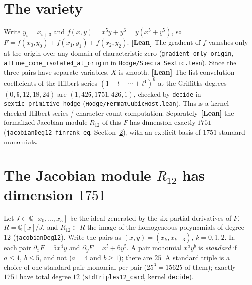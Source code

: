 \documentclass[11pt]{amsart}
\theoremstyle{remark}\newtheorem{remark}[theorem]{Remark}
\newcommand{\Q}{\mathbb{Q}}\newcommand{\PP}{\mathbb{P}}
\begin{document}
\section{The variety}
Write $y_i=x_{i+3}$ and $f(x,y)=x^5y+y^6=y(x^5+y^5)$, so $F=f(x_0,y_0)+f(x_1,y_1)+f(x_2,y_2)$.
\textbf{[Lean]} The gradient of $f$ vanishes only at the origin over any domain of characteristic
zero (\texttt{gradient\_only\_origin}, \texttt{affine\_cone\_isolated\_at\_origin} in
\texttt{Hodge/SpecialSextic.lean}). Since the three pairs have separate variables, $X$ is smooth.
\textbf{[Lean]} The list-convolution coefficients of the Hilbert series
$(1+t+\cdots+t^4)^6$ at the Griffiths degrees $(0,6,12,18,24)$ are
$(1,426,1751,426,1)$, checked by \texttt{decide} in
\texttt{sextic\_primitive\_hodge} (\texttt{Hodge/FermatCubicHost.lean}).
This is a kernel-checked Hilbert-series / character-count computation. Separately,
\textbf{[Lean]} the formalized Jacobian module $R_{12}$ of this $F$ has dimension
exactly $1751$ (\texttt{jacobianDeg12\_finrank\_eq}, Section~\ref{sec:r12}), with an
explicit basis of $1751$ standard monomials.

\section{The Jacobian module $R_{12}$ has dimension $1751$}\label{sec:r12}
Let $J\subset\Q[x_0,\dots,x_5]$ be the ideal generated by the six partial derivatives
of $F$, $R=\Q[x]/J$, and $R_{12}\subset R$ the image of the homogeneous polynomials of
degree $12$ (\texttt{jacobianDeg12}). Write the pairs as $(x,y)=(x_k,x_{k+3})$, $k=0,1,2$.
In each pair $\partial_xF=5x^4y$ and $\partial_yF=x^5+6y^5$.
A pair monomial $x^ay^b$ is \emph{standard} if $a\le4$, $b\le5$, and not ($a=4$ and
$b\ge1$); there are $25$. A standard triple is a choice of one standard pair monomial
per pair ($25^3=15625$ of them); exactly $1751$ have total degree $12$
(\texttt{stdTriples12\_card}, kernel \texttt{decide}).
\end{document}
